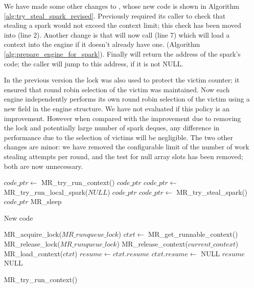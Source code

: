 We have made some other changes to \trystealspark,
whose new code is shown in Algorithm \ref{alg:try_steal_spark_revised}.
Previously \trystealspark required its caller to check that stealing a spark
would not exceed the context limit;
this check has been moved into \trystealspark (line 2).
Another change is that \trystealspark
will now call \prepareengineforspark (line 7)
which will load a context into the engine if it doesn't already have one.
(Algorithm \ref{alg:prepare_engine_for_spark}).
Finally \trystealspark will return the address of the spark's code;
the caller will jump to this address,
if it is not NULL.

In the previous version the lock was also used to protect the victim
counter;
it ensured that round robin selection of the victim was maintained.
Now each engine independently performs its own round robin selection of the
victim using a new field  in the engine structure.
We have not evaluated if this policy is an improvement.
However when compared with the improvement due to removing the lock and
potentially large number of spark deques,
any difference in performance due to the selection of victims will be
negligible.
The two other changes are minor:
we have removed the configurable limit of the number of work stealing
attempts per round,
and the test for null array slots has been removed;
both are now unnecessary.

\begin{algorithm}[tbp]
\begin{algorithmic}
        \State $code\_ptr \gets$ MR\_try\_run\_context()
            \Goto $code\_ptr$
        \EndIf
        \State $code\_ptr \gets$ MR\_try\_run\_local\_spark($NULL$)
            \Goto $code\_ptr$
        \EndIf
        \State $code\_ptr \gets$ MR\_try\_steal\_spark()
            \Goto $code\_ptr$
        \EndIf
        \Goto MR\_sleep
    \EndProcedure
\end{algorithmic}
\caption{New \idle code}
\label{alg:idle_entry_point}
\end{algorithm}

\begin{algorithm}[tbp]
\begin{algorithmic}
    \State MR\_acquire\_lock($MR\_runqueue\_lock$)
    \State $ctxt \gets$ MR\_get\_runnable\_context()
    \State MR\_release\_lock($MR\_runqueue\_lock$)
            \State MR\_release\_context($current\_context$)
        \EndIf
        \State MR\_load\_context($ctxt$)
        \State $resume \gets ctxt.resume$
        \State $ctxt.resume \gets$ NULL
        \State \Return $resume$
    \Else
        \State \Return NULL
    \EndIf
\EndProcedure
\end{algorithmic}
\caption{MR\_try\_run\_context()}
\label{alg:try_run_context}
\end{algorithm}

